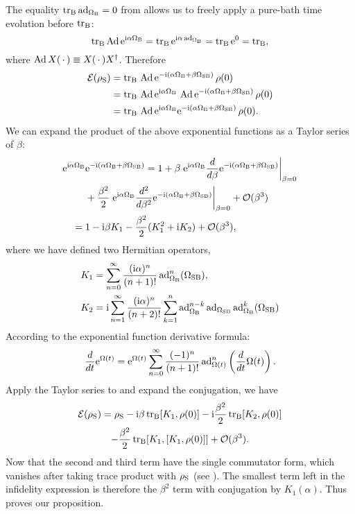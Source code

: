 \documentclass[aps,pra,reprint,superscriptaddress]{revtex4-2}
\begin{document}
The equality $\operatorname{\operatorname{tr}_\mathrm{B}} \operatorname{ad}_{\Omega_{\mathrm{B}}} = 0$ from  allows us to freely apply a pure-bath time evolution before $\operatorname{\operatorname{tr}_\mathrm{B}}$:
\begin{equation}
    \operatorname{\operatorname{tr}_\mathrm{B}} \operatorname{Ad} \mathrm{e}^{\mathrm{i} \alpha \Omega_{\mathrm{B}}} = \operatorname{\operatorname{tr}_\mathrm{B}} \mathrm{e}^{\mathrm{i} \alpha \operatorname{ad}_{\Omega_{\mathrm{B}}}} = \operatorname{\operatorname{tr}_\mathrm{B}} \mathrm{e}^{0} = \operatorname{\operatorname{tr}_\mathrm{B}},
\end{equation}
where $\operatorname{Ad} X ({\,\cdot\,})\equiv X ({\,\cdot\,}) X^\dagger$.
Therefore
\begin{equation}\label{eq:rhoS-interaction}
\begin{split}
\mathcal{E}(\rho_\mathrm{S}) &= \operatorname{\operatorname{tr}_\mathrm{B}}\, \operatorname{Ad} \mathrm{e}^{-\mathrm{i} (\alpha \Omega_{\mathrm{B}} + \beta \Omega_{\mathrm{SB}})} \, \rho(0)\\
&= \operatorname{\operatorname{tr}_\mathrm{B}}\, \operatorname{Ad} \mathrm{e}^{\mathrm{i} \alpha \Omega_{\mathrm{B}}}\, \operatorname{Ad} \mathrm{e}^{-\mathrm{i} (\alpha \Omega_{\mathrm{B}} + \beta \Omega_{\mathrm{SB}})} \, \rho(0) \\
&= \operatorname{\operatorname{tr}_\mathrm{B}}\, \operatorname{Ad} \mathrm{e}^{\mathrm{i} \alpha \Omega_{\mathrm{B}}} \mathrm{e}^{-\mathrm{i} (\alpha \Omega_{\mathrm{B}} + \beta \Omega_{\mathrm{SB}})}\, \rho(0).
\end{split}
\end{equation}
We can expand the product of the above exponential functions as a Taylor series of $\beta$:
\begin{align}
\mathrm{e}^{\mathrm{i} \alpha \Omega_{\mathrm{B}}} &\mathrm{e}^{-\mathrm{i} (\alpha \Omega_{\mathrm{B}} + \beta \Omega_{\mathrm{SB}})} 
= 1 + \beta
\left. \mathrm{e}^{\mathrm{i} \alpha \Omega_{\mathrm{B}}} \frac{d}{d\beta}\mathrm{e}^{-\mathrm{i} (\alpha \Omega_{\mathrm{B}} + \beta \Omega_{\mathrm{SB}})} \right|_{\beta=0} \notag \\
&+ \frac{\beta^2}{2}
\left. \mathrm{e}^{\mathrm{i} \alpha \Omega_{\mathrm{B}}} \frac{d^2}{d\beta^2}\mathrm{e}^{-\mathrm{i} (\alpha \Omega_{\mathrm{B}} + \beta \Omega_{\mathrm{SB}})} \right|_{\beta=0} +\mathcal{O}(\beta^3) \notag \\
={}& 1 - \mathrm{i} \beta K_1 -\frac{\beta^2}{2} (K_1^2+ \mathrm{i} K_2)  + \mathcal{O}(\beta^3),
\end{align}
where we have defined two Hermitian operators,
\begin{align}
& K_1 = \sum_{n=0}^{\infty} \frac{(\mathrm{i} \alpha)^n}{(n+1)!}\operatorname{ad}^n_{\Omega_{\mathrm{B}}}(\Omega_{\mathrm{SB}}), \\
& K_2 = \mathrm{i} \sum_{n=1}^\infty \frac{(\mathrm{i} \alpha)^n}{(n+2)!}\sum_{k=1}^n \operatorname{ad}^{n-k}_{\Omega_{\mathrm{B}}} \operatorname{ad}_{\Omega_{\mathrm{SB}}} \operatorname{ad}^k_{\Omega_{\mathrm{B}}} (\Omega_{\mathrm{SB}})
\end{align}
According to the exponential function derivative  formula:
\begin{equation}
\frac{d}{dt}\mathrm{e}^{\Omega(t)}=\mathrm{e}^{\Omega(t)} \sum_{n=0}^\infty \frac{(-1)^n}{(n+1)!}\operatorname{ad}_{\Omega(t)}^n\left(\frac{d}{dt}\Omega(t)\right).
\end{equation} 
Apply the Taylor series to  and expand the conjugation, we have
\begin{multline}
\mathcal{E}(\rho_\mathrm{S}) = \rho_{\mathrm{S}} - \mathrm{i} \beta \operatorname{\operatorname{tr}_\mathrm{B}}[K_1,\rho(0)] - \mathrm{i} \frac{\beta^2}{2}\operatorname{\operatorname{tr}_\mathrm{B}}[K_2,\rho(0)] \\
- \frac{\beta^2}{2}\operatorname{\operatorname{tr}_\mathrm{B}}[K_1,[K_1,\rho(0)]] + \mathcal{O}(\beta^3).
\end{multline}
Now that the second and third term have the single commutator form, which vanishes after taking trace product with $\rho_{\mathrm{S}}$ (see ). The smallest term left in the infidelity expression is therefore the $\beta^2$ term with conjugation by $K_1(\alpha)$. Thus 
proves our proposition. 
\end{document}
